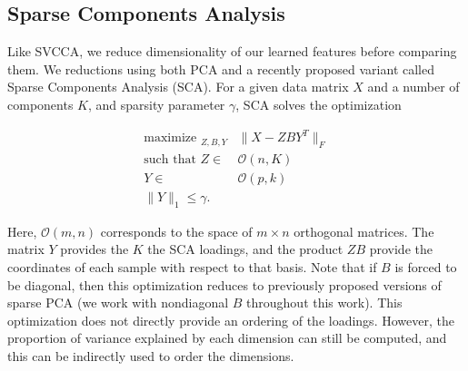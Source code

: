 \subsection{Sparse Components Analysis}

Like SVCCA, we reduce dimensionality of our learned features before comparing
them. We reductions using both PCA and a recently proposed variant called Sparse
Components Analysis (SCA). For a given data matrix $X$ and a number of
components $K$, and sparsity parameter $\gamma$, SCA solves the optimization

\begin{align*}
  \text{maximize }_{Z, B, Y} &\|X - Z B Y^{T}\|_{F} \\
  \text{such that }Z \in &\mathcal{O}\left(n, K\right) \\
  Y \in &\mathcal{O}\left(p, k\right) \\
  \|Y\|_{1} \leq \gamma.
\end{align*}

Here, $\mathcal{O}\left(m, n\right)$ corresponds to the space of $m \times n$
orthogonal matrices. The matrix $Y$ provides the $K$ the SCA loadings, and the
product $ZB$ provide the coordinates of each sample with respect to that basis.
Note that if $B$ is forced to be diagonal, then this optimization reduces to
previously proposed versions of sparse PCA (we work with nondiagonal $B$
throughout this work). This optimization does not directly provide an ordering
of the loadings. However, the proportion of variance explained by each dimension
can still be computed, and this can be indirectly used to order the dimensions.

